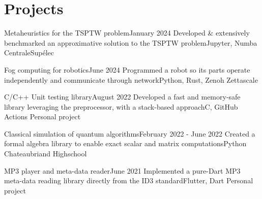 \section{Projects}
\resumeSubHeadingListStart
    \resumeProjectHeading
    {Metaheuristics for the TSPTW problem}{January 2024}
    {Developed \& extensively benchmarked an approximative solution to the TSPTW problem}{Jupyter, Numba}
    {}
    {CentraleSupélec}

    \resumeProjectHeading
    {Fog computing for robotics}{June 2024}
    {Programmed a robot so its parts operate independently and communicate through network}{Python, Rust, Zenoh}
    {}
    {Zettascale}

    \resumeProjectHeading
    {C/C++ Unit testing library}{\quad August 2022}
    {Developed a fast and memory-safe library leveraging the preprocessor, with a stack-based approach}{C, GitHub Actions}
    {}
    {Personal project}
    \vspace{-7pt}
    \resumeItemListStart
    \resumeItemListEnd

    \resumeProjectHeading
    {Classical simulation of quantum algorithms}{February 2022 - June 2022}
    {Created a formal algebra library to enable exact scalar and matrix computations}{Python}
    {}
    {Chateaubriand Highschool}
    \vspace{-7pt}
    \resumeItemListStart
    \resumeItemListEnd

    \resumeProjectHeading
    {MP3 player and meta-data reader}{June 2021}
    {Implemented a pure-Dart MP3 meta-data reading library directly from the ID3 standard}{Flutter, Dart}
    {}
    {Personal project}
    \vspace{-7pt}
    \resumeItemListStart
    \resumeItemListEnd


\resumeSubHeadingListEnd
